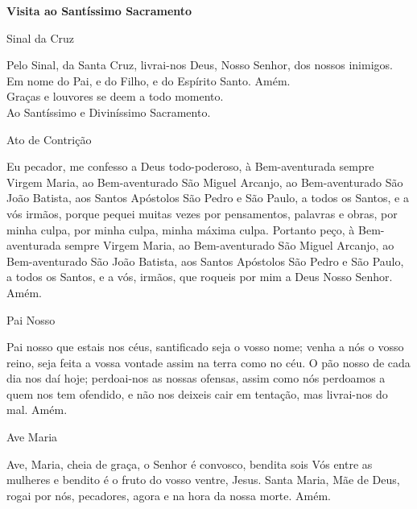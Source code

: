 \newpage
\begin{center}
    \textbf{Visita ao Santíssimo Sacramento}
\end{center}
\begin{center}
    Sinal da Cruz
\end{center}
\begin{flushleft}
    Pelo Sinal, \grecrossRed{} da Santa Cruz, livrai-nos Deus, \grecrossRed{} Nosso Senhor, dos nossos \grecrossRed{} inimigos. Em nome do Pai, \grecrossRed{} e do Filho, e do Espírito Santo. Amém.
    \vspace{.2cm} \\
    \VbarRed{} Graças e louvores se deem a todo momento. \\
    \RbarRed{} Ao Santíssimo e Diviníssimo Sacramento.
\end{flushleft}
\begin{center}
    Ato de Contrição
\end{center}
\begin{flushleft}
    Eu pecador, me confesso a Deus todo-poderoso, à Bem-aventurada sempre Virgem Maria, ao Bem-aventurado São Miguel Arcanjo, ao Bem-aventurado São João Batista, aos Santos Apóstolos São Pedro e São Paulo, a todos os Santos, e a vós irmãos, porque pequei muitas vezes por pensamentos, palavras e obras, por minha culpa, por minha culpa, minha máxima culpa. Portanto peço, à Bem-aventurada sempre Virgem Maria, ao Bem-aventurado São Miguel Arcanjo, ao Bem-aventurado São João Batista, aos Santos Apóstolos São Pedro e São Paulo, a todos os Santos, e a vós, irmãos, que roqueis por mim a Deus Nosso Senhor. Amém.
\end{flushleft}
\begin{center}
    Pai Nosso
\end{center}
\begin{flushleft}
    Pai nosso que estais nos céus, santificado seja o vosso nome; venha a nós o vosso reino, seja feita a vossa vontade assim na terra como no céu. O pão nosso de cada dia nos daí hoje; perdoai-nos as nossas ofensas, assim como nós perdoamos a quem nos tem ofendido, e não nos deixeis cair em tentação, mas livrai-nos do mal. Amém.
\end{flushleft}
\begin{center}
    Ave Maria
\end{center}
\begin{flushleft}
    Ave, Maria, cheia de graça, o Senhor é convosco, bendita sois Vós entre as mulheres e bendito é o fruto do vosso ventre, Jesus. Santa Maria, Mãe de Deus, rogai por nós, pecadores, agora e na hora da nossa morte. Amém.
\end{flushleft}
